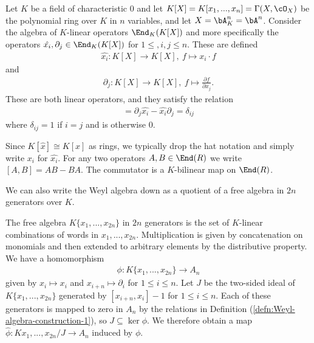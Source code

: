 \begin{defn}\label{defn:Weyl-algebra-construction-1}
	Let $K$ be a field of characteristic $0$ and let $K[X] = K[x_1,...,x_n] = \Gamma(X,\cO_X)$ be the polynomial ring over $K$ in $n$ variables, and let $X = \bA^n_K = \bA^n$. Consider the algebra of $K$-linear operators $\End_K(K[X])$ and more specifically the operators $\hat{x_i}, \partial_j \in \End_K(K[X])$ for $1\leq, i,j \leq n$. These are defined
	\begin{align*}
		\hat{x_i}: K[X]\to K[X], ~ f \mapsto x_i \cdot f
	\end{align*}
	and 
	\begin{align*}
		\partial_j:K[X]\to K[X], ~ f\mapsto \frac{\partial f}{\partial x_j}.
	\end{align*}
	These are both linear operators, and they satisfy the relation
	\begin{align*}
		[\partial_j, \hat{x_i}] = \partial_j \hat{x_i} - \hat{x_i}\partial_j = \delta_{ij}
	\end{align*}
	where $\delta_{ij} = 1$ if $i = j$ and is otherwise 0. 
\end{defn}
Since $K[\hat{x}] \cong K[x]$ as rings, we typically drop the hat notation and simply write $x_i$ for $\hat{x_i}$. For any two operators $A,B \in \End(R)$ we write  $[A,B] = AB - BA$. The commutator is a $K$-bilinear map on $\End(R)$.

We can also write the Weyl algebra down as a quotient of a free algebra in $2n$ generators over $K$.

\begin{defn}\label{defn:Weyl-algebra-construction-2}
	The free algebra $K\{x_1,...,x_{2n}\}$ in $2n$ generators is the set of $K$-linear combinations of words in $x_1,...,x_{2n}$. Multiplication is given by concatenation on monomials and then extended to arbitrary elements by the distributive property. We have a homomorphism
	\begin{align*}
		\phi:K\{x_1,...,x_{2n}\} \to A_n
	\end{align*}
	given by $x_i \mapsto x_i$ and $x_{i+n} \mapsto \partial_i$ for $1\leq i\leq n$. Let $J$ be the two-sided ideal of  $K\{x_1,...,x_{2n}\}$ generated by $[x_{i+n},x_i] - 1$ for $1\leq i\leq n$. Each of these generators is mapped to zero in $A_n$ by the relations in Definition (\ref{defn:Weyl-algebra-construction-1}), so $J \subseteq \ker \phi$. We therefore obtain a map $\hat{\phi}:K{x_1,...,x_{2n}}/J\to A_n$ induced by $\phi$.
\end{defn}

